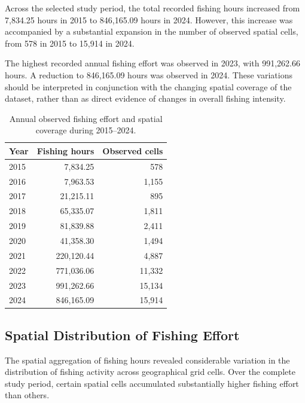 \documentclass[pdflatex,sn-mathphys-num]{sn-jnl}
\theoremstyle{thmstyleone}
\theoremstyle{thmstyletwo}
\theoremstyle{thmstylethree}
\begin{document}
Across the selected study period, the total recorded
fishing hours increased from 7,834.25 hours in 2015
to 846,165.09 hours in 2024. However, this increase
was accompanied by a substantial expansion in the
number of observed spatial cells, from 578 in 2015
to 15,914 in 2024.

The highest recorded annual fishing effort was
observed in 2023, with 991,262.66 hours. A reduction
to 846,165.09 hours was observed in 2024. These
variations should be interpreted in conjunction
with the changing spatial coverage of the dataset,
rather than as direct evidence of changes in
overall fishing intensity.

\begin{table}[!htbp]
\centering
\caption{Annual observed fishing effort and spatial
coverage during 2015--2024.}
\label{tab:annual-effort}
\small
\begin{tabular}{lrr}
\toprule
Year & Fishing hours & Observed cells \\
\midrule
2015 & 7,834.25 & 578 \\
2016 & 7,963.53 & 1,155 \\
2017 & 21,215.11 & 895 \\
2018 & 65,335.07 & 1,811 \\
2019 & 81,839.88 & 2,411 \\
2020 & 41,358.30 & 1,494 \\
2021 & 220,120.44 & 4,887 \\
2022 & 771,036.06 & 11,332 \\
2023 & 991,262.66 & 15,134 \\
2024 & 846,165.09 & 15,914 \\
\bottomrule
\end{tabular}
\end{table}

\FloatBarrier



\subsection{Spatial Distribution of Fishing Effort}
\label{subsec:spatial-results}

The spatial aggregation of fishing hours revealed
considerable variation in the distribution of
fishing activity across geographical grid cells.
Over the complete study period, certain spatial
cells accumulated substantially higher fishing
effort than others.
\end{document}
